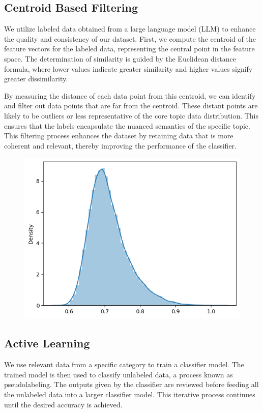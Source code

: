 \documentclass[preprint]{article}
\begin{document}
\subsection{Centroid Based Filtering}

We utilize labeled data obtained from a large language model (LLM) to enhance the quality and consistency of our dataset. First, we compute the centroid of the feature vectors for the labeled data, representing the central point in the feature space. The determination of similarity is guided by the Euclidean distance formula, where lower values indicate greater similarity and higher values signify greater dissimilarity. 

By measuring the distance of each data point from this centroid, we can identify and filter out data points that are far from the centroid. These distant points are likely to be outliers or less representative of the core topic data distribution. This ensures that the labels encapsulate the nuanced semantics of the specific topic. This filtering process enhances the dataset by retaining data that is more coherent and relevant, thereby improving the performance of the classifier.


\begin{figure}[h]
  \centering
  \includegraphics[width=0.6\linewidth]{img/centroid-distance.png}
\end{figure}

\subsection{Active Learning}

We use relevant data from a specific category to train a classifier model. The trained model is then used to classify unlabeled data, a process known as pseudolabeling. The outputs given by the classifier are reviewed before feeding all the unlabeled data into a larger classifier model. This iterative process continues until the desired accuracy is achieved.
\end{document}
